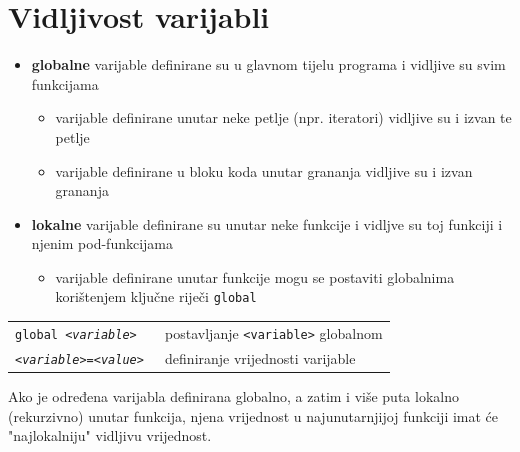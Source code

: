 \documentclass[10pt]{article}
\begin{document}
    \section*{\color{NavyBlue} Vidljivost varijabli}
    \begin{itemize}
        \item \textbf{globalne} varijable definirane su u glavnom tijelu programa i vidljive su svim funkcijama
        \begin{itemize}
            \item varijable definirane unutar neke petlje (npr. iteratori) vidljive su i izvan te petlje
            \item varijable definirane u bloku koda unutar grananja vidljive su i izvan grananja
        \end{itemize}
        \item \textbf{lokalne} varijable definirane su unutar neke funkcije i vidljve su toj funkciji i njenim pod-funkcijama
        \begin{itemize}
            \item varijable definirane unutar funkcije mogu se postaviti globalnima korištenjem ključne riječi \texttt{global}
        \end{itemize}
    \end{itemize}
    \begin{tabular}{|>{\tt}p{9.00cm}|>{}p{15.50cm}|}
        \hline
        global \textit{<variable>} & postavljanje \texttt{<variable>} globalnom
        \\
        \textit{<variable>}=\textit{<value>} & definiranje vrijednosti varijable
        \\ \hline
    \end{tabular}
    \begin{center}
        \footnotesize
        Ako je određena varijabla definirana globalno, a zatim i više puta lokalno (rekurzivno) unutar funkcija, njena vrijednost u najunutarnjijoj funkciji imat će "najlokalniju" vidljivu vrijednost. \\
    \end{center}
\end{document}
